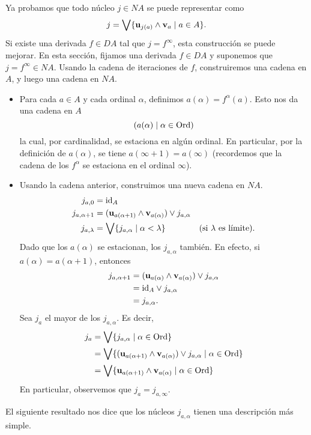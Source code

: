 Ya probamos que todo núcleo $j\in NA$ se puede representar como
\[
    j = \bigvee\{\mathbf u_{j(a)}\wedge \mathbf v_{a} \mid a\in A \}
.\]
Si existe una derivada $f\in DA$ tal que $j=f^\infty$,
esta construcción se puede mejorar.
En esta sección, fijamos una derivada $f\in DA$ y suponemos que
$j=f^\infty\in NA$.
Usando la cadena de iteraciones de $f$, construiremos una cadena
en $A$, y luego una cadena en $NA$.
\begin{itemize}
  \item
  Para cada $a\in A$ y cada ordinal $\alpha$, definimos
  $a(\alpha)=f^\alpha(a)$.
  Esto nos da una cadena en $A$
  \[
    (a(\alpha) \mid \alpha\in\mathrm{Ord})
  \]
  la cual, por cardinalidad, se estaciona en algún ordinal.
  En particular, por la definición de $a(\alpha)$, se tiene
  $a(\infty+1)=a(\infty)$ (recordemos que la cadena de los
  $f^\alpha$ se estaciona en el ordinal $\infty$).
  \item
  Usando la cadena anterior, construimos una nueva cadena en $NA$.
  \begin{align*}
    j_{a,0}
    &= \mathrm{id}_A \\
    j_{a,\alpha+1}
    &= (\mathbf u_{a(\alpha+1)}\wedge \mathbf v_{a(\alpha)})\vee j_{a,\alpha}
    \\
    j_{a,\lambda}
    &= \bigvee\{j_{a,\alpha} \mid \alpha < \lambda\}
      & \text{(si $\lambda$ es límite).}
  \end{align*}
  Dado que los $a(\alpha)$ se estacionan, los $j_{a,\alpha}$ también.
  En efecto, si $a(\alpha) = a(\alpha+1)$, entonces
  \begin{align*}
    j_{a,\alpha+1}
    &= (\mathbf u_{a(\alpha)}\wedge \mathbf v_{a(\alpha)})
      \vee j_{a,\alpha} \\
    &= \mathrm{id}_A\vee j_{a,\alpha} \\
    &= j_{a,\alpha}.
  \end{align*}
  Sea $j_a$ el mayor de los $j_{a,\alpha}$.
  Es decir,
  \begin{align*}
    j_a
    &= \bigvee\{j_{a,\alpha} \mid \alpha\in\mathrm{Ord}\} \\
    &= \bigvee\{(\mathbf u_{a(\alpha+1)}\wedge\mathbf v_{a(\alpha)})
      \vee j_{a,\alpha} \mid \alpha\in\mathrm{Ord}\} \\
    &= \bigvee\{\mathbf u_{a(\alpha+1)}\wedge\mathbf v_{a(\alpha)}
    \mid \alpha\in\mathrm{Ord}\}
  \end{align*}
  En particular, observemos que $j_a=j_{a,\infty}$.
\end{itemize}
El siguiente resultado nos dice que los núcleos
$j_{a,\alpha}$ tienen una descripción más simple.

